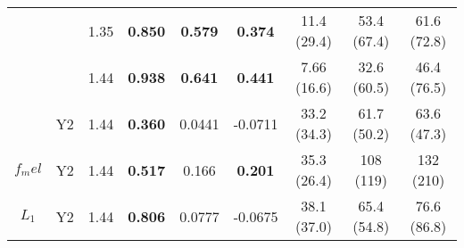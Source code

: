 \begin{table}[htb!]
\begin{tabular}{|ccc|ccc|ccc|}
        & & 1.35 & \textbf{0.850} & \textbf{0.579} & \textbf{0.374} & 11.4 (29.4) & 53.4 (67.4) & 61.6 (72.8) \\
        & & 1.44 & \textbf{0.938} & \textbf{0.641} & \textbf{0.441} & 7.66 (16.6) & 32.6 (60.5) & 46.4 (76.5) \\
        \cline{2-9}
        & Y2 & 1.44 & \textbf{0.360} & 0.0441 & -0.0711 & 33.2 (34.3) & 61.7 (50.2) & 63.6 (47.3) \\
        \hline
        $f_mel$ & Y2 & 1.44 & \textbf{0.517} & 0.166 & \textbf{0.201} & 35.3 (26.4) & 108 (119) & 132 (210) \\
        \hline
        $L_1$ & Y2 & 1.44 & \textbf{0.806} & 0.0777 & -0.0675 & 38.1 (37.0) & 65.4 (54.8) & 76.6 (86.8) \\
        \hline
    \end{tabular}    
    \label{ap:backwardsHSIMCr}
\end{table}